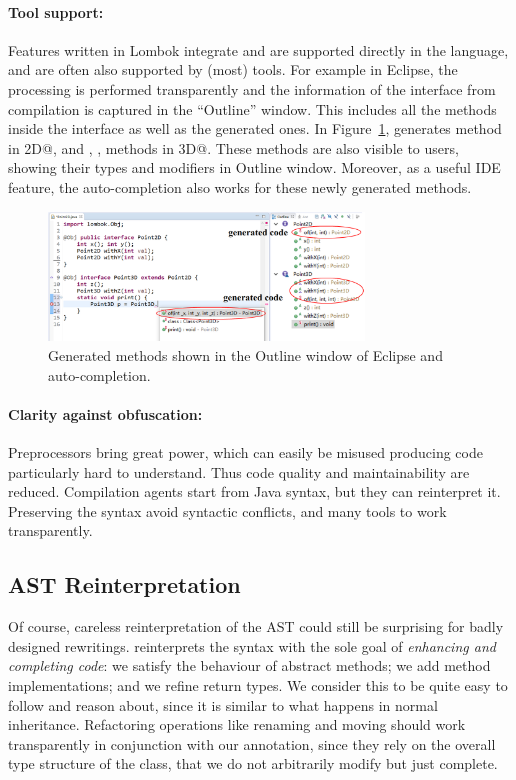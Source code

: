 \paragraph{Tool support:}
Features written in Lombok integrate and are supported directly in the
language, and are often also supported by (most) tools.  For example in Eclipse, the processing is
performed transparently and the information of the interface from
compilation is captured in the ``Outline'' window.
This includes all
the methods inside the interface as well as the generated ones.
In Figure~\ref{fig:screenshot},
\mixin generates \Q@of@ method in \Q@Point2D@, and \Q@of@, \Q@withX@, \Q@withY@ methods in \Q@Point3D@.
These methods are also visible to users, showing their types and modifiers in Outline window.
Moreover, as a useful IDE feature, the auto-completion also works for these newly generated methods.

\begin{figure}[h]
\centering
\includegraphics[width=3.3in]{pdfs/screenshot4.png}
\caption{Generated methods shown in the Outline window of Eclipse and auto-completion.}
\label{fig:screenshot}
\end{figure}

\paragraph{Clarity against obfuscation:}
Preprocessors bring great power, which can easily be misused producing
code particularly hard to understand. Thus code quality and maintainability are reduced.
Compilation agents start from Java syntax, but they can reinterpret it.
Preserving the syntax avoid syntactic conflicts, and  many
tools to work transparently.

\subsection{\mixin AST Reinterpretation}

Of course, careless reinterpretation of the AST could still be
surprising for badly designed rewritings.  \mixin reinterprets
the syntax with the sole goal of \emph{enhancing and completing code}:
we satisfy the behaviour of abstract methods; we add method
implementations; and we refine return types.  We consider this to be
quite easy to follow and reason about, since it is similar to what
happens in normal inheritance.  Refactoring operations like renaming
and moving should work transparently in conjunction with our
annotation, since they rely on the overall type structure of the
class, that we do not arbitrarily modify but just complete.

